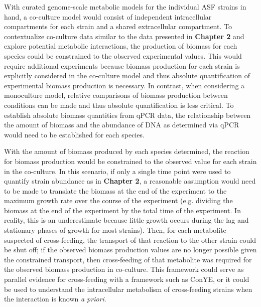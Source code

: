 \documentclass[11pt,twocolumn,notitlepage,openany,twoside]{book}
\begin{document}
\begin{refsection}
With curated genome-scale metabolic models for the individual ASF strains in hand, a co-culture model would consist of independent intracellular compartments for each strain and a shared extracellular compartment. To contextualize co-culture data similar to the data presented in \textbf{Chapter 2} and explore potential metabolic interactions, the production of biomass for each species could be constrained to the observed experimental values. This would require additional experiments because biomass production for each strain is explicitly considered in the co-culture model and thus absolute quantification of experimental biomass production is necessary. In contrast, when considering a monoculture model, relative comparisons of biomass production between conditions can be made and thus absolute quantification is less critical. To establish absolute biomass quantities from qPCR data, the relationship between the amount of biomass and the abundance of DNA as determined via qPCR would need to be established for each species.

With the amount of biomass produced by each species determined, the reaction for biomass production would be constrained to the observed value for each strain in the co-culture. In this scenario, if only a single time point were used to quantify strain abundance as in \textbf{Chapter 2}, a reasonable assumption would need to be made to translate the biomass at the end of the experiment to the maximum growth rate over the course of the experiment (e.g. dividing the biomass at the end of the experiment by the total time of the experiment. In reality, this is an underestimate because little growth occurs during the lag and stationary phases of growth for most strains). Then, for each metabolite suspected of cross-feeding, the transport of that reaction to the other strain could be shut off; if the observed biomass production values are no longer possible given the constrained transport, then cross-feeding of that metabolite was required for the observed biomass production in co-culture. This framework could serve as parallel evidence for cross-feeding with a framework such as ConYE, or it could be used to understand the intracellular metabolism of cross-feeding strains when the interaction is known \textit{a priori}.


\end{refsection}
\end{document}
